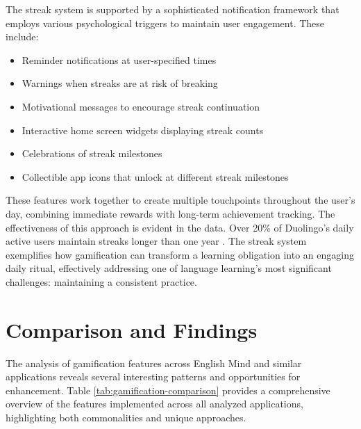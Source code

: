 \begin{itemize}
    The streak system is supported by a sophisticated notification framework that employs various psychological triggers to maintain user engagement. These include:

    \begin{itemize}
        \item Reminder notifications at user-specified times
        \item Warnings when streaks are at risk of breaking
        \item Motivational messages to encourage streak continuation
        \item Interactive home screen widgets displaying streak counts
        \item Celebrations of streak milestones
        \item Collectible app icons that unlock at different streak milestones
    \end{itemize}

    These features work together to create multiple touchpoints throughout the user's day, combining immediate rewards with long-term achievement tracking. The effectiveness of this approach is evident in the data. Over 20\% of Duolingo's daily active users maintain streaks longer than one year \cite{cite:duolingo_2024q2}. The streak system exemplifies how gamification can transform a learning obligation into an engaging daily ritual, effectively addressing one of language learning's most significant challenges: maintaining a consistent practice.
    
\end{itemize}

\section{Comparison and Findings}

The analysis of gamification features across English Mind and similar applications reveals several interesting patterns and opportunities for enhancement. Table \ref{tab:gamification-comparison} provides a comprehensive overview of the features implemented across all analyzed applications, highlighting both commonalities and unique approaches.

